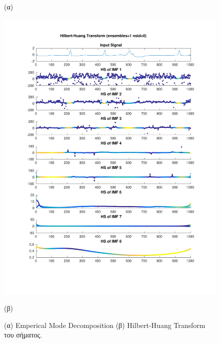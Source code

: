 \documentclass[11pt,a4paper]{article}
\begin{document}
\begin{figure}[H]
\begin{minipage}{0.48\textwidth}
	(α)
\end{minipage}
\begin{minipage}{0.48\textwidth}
	\centering
	\includegraphics[width=\textwidth]{fig/221l1_hht.pdf}
	
	(β)
\end{minipage}
\vfill
\caption{(α) Emperical Mode Decomposition (β) Hilbert-Huang Transform του σήματος.}
\label{fig:221l1_hht}
\end{figure}
\end{document}
